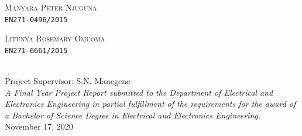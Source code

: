 \begin{spacing}{1.1}
\begin{titlepage}
\begin{center}
		\hfill
		\begin{minipage}{0.45\textwidth}
			\raggedleft\normalsize
			\textsc{Manyara Peter Njuguna}\\
			\texttt{EN271-0496/2015}
		\end{minipage}
		\hfill
		\begin{minipage}{0.45\textwidth}
			\raggedright\normalsize
			\textsc{Litunya Rosemary Omuoma}\\
			\texttt{EN271-6661/2015}
		\end{minipage}
		\hfill\\
		\vfill
		{\large
			Project Supervisor: S.N. Manegene
		}\\
		\vfill
		{\normalsize\itshape
			A Final Year Project Report submitted to the Department of Electrical and
		Electronics Engineering in partial fulfillment of the requirements for the award of a
		Bachelor of Science Degree in Electrical and Electronics Engineering.
		}\\
		\vfill
		{\large November 17, 2020}
  \end{center}
\end{titlepage}
\end{spacing}
